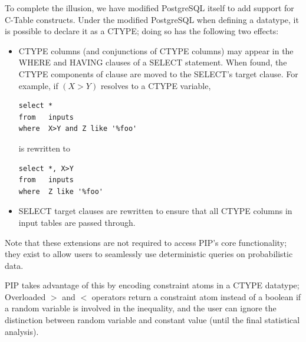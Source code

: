 
To complete the illusion, we have modified PostgreSQL itself to add support for C-Table constructs.  Under the modified PostgreSQL when defining a datatype, it is possible to declare it as a CTYPE; doing so has the following two effects:
\begin{itemize}
\item CTYPE columns (and conjunctions of CTYPE columns) may appear in the WHERE and HAVING clauses of a SELECT statement.  When found, the CTYPE components of clause are moved to the SELECT's target clause.  For example, if $(X>Y)$ resolves to a CTYPE variable, 
\begin{verbatim}
select *
from   inputs
where  X>Y and Z like '%foo'
\end{verbatim}
is rewritten to
\begin{verbatim}
select *, X>Y
from   inputs
where  Z like '%foo'
\end{verbatim}

\item SELECT target clauses are rewritten to ensure that all CTYPE columns in input tables are passed through.
\end{itemize}

Note that these extensions are not required to access PIP's core functionality; they exist to allow users to seamlessly use deterministic queries on probabilistic data.

PIP takes advantage of this by encoding constraint atoms in a CTYPE datatype; Overloaded $>$ and $<$ operators return a constraint atom instead of a boolean if a random variable is involved in the inequality, and the user can ignore the distinction between random variable and constant value (until the final statistical analysis).

